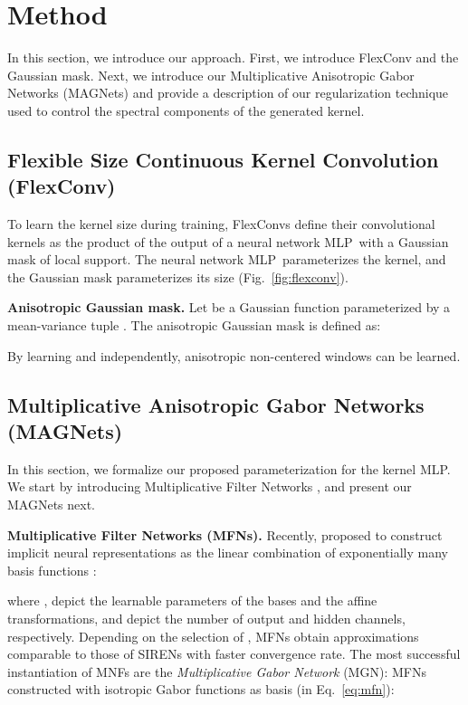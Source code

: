 \documentclass{article} \usepackage{iclr2022_conference,times}
\newcommand{\mlp}{{\btt MLP}}
\newcommand{\mlppsi}{\mlp}
\begin{document}
\section{Method}
\vspace{-2mm}
In this section, we introduce our approach. First, we introduce FlexConv and the Gaussian mask. Next, we introduce our Multiplicative Anisotropic Gabor Networks (MAGNets) and provide a description of our regularization technique used to control the spectral components of the generated kernel.
\vspace{-2mm}
\subsection{Flexible Size Continuous Kernel Convolution (FlexConv)}
\label{sec:flexconv}
\vspace{-2mm}
To learn the kernel size during training, FlexConvs define their convolutional kernels  as the product of the output of a neural network \mlppsi\ with a Gaussian mask of local support. The neural network \mlppsi\ parameterizes the kernel, and the Gaussian mask parameterizes its size (Fig.~\ref{fig:flexconv}).

\textbf{Anisotropic Gaussian mask.} Let  
be a Gaussian function parameterized by a mean-variance tuple . The anisotropic Gaussian mask is defined as:

By learning  and  independently, anisotropic non-centered windows can be learned.


\vspace{-2mm}
\subsection{Multiplicative Anisotropic Gabor Networks (MAGNets)}
\label{sec:magnets}
\vspace{-2mm}
In this section, we formalize our proposed parameterization for the kernel \mlppsi. We start by introducing Multiplicative Filter Networks \citep{fathony2021multiplicative}, and present our MAGNets next.

\textbf{Multiplicative Filter Networks (MFNs).} Recently, \citet{fathony2021multiplicative} proposed to construct implicit neural representations as the linear combination of exponentially many basis functions :
\vspace{-0.5mm}

\vspace{-5.5mm}

where ,  depict the learnable parameters of the bases and the affine transformations, and  depict the number of output and hidden channels, respectively. Depending on the selection of , MFNs obtain approximations comparable to those of SIRENs \citep{sitzmann2020implicit} with faster convergence rate. The most successful instantiation of MNFs are the \textit{Multiplicative Gabor Network} (MGN): MFNs constructed with isotropic Gabor functions as basis  (in Eq.~\ref{eq:mfn}):
\vspace{-1mm}
\end{document}
